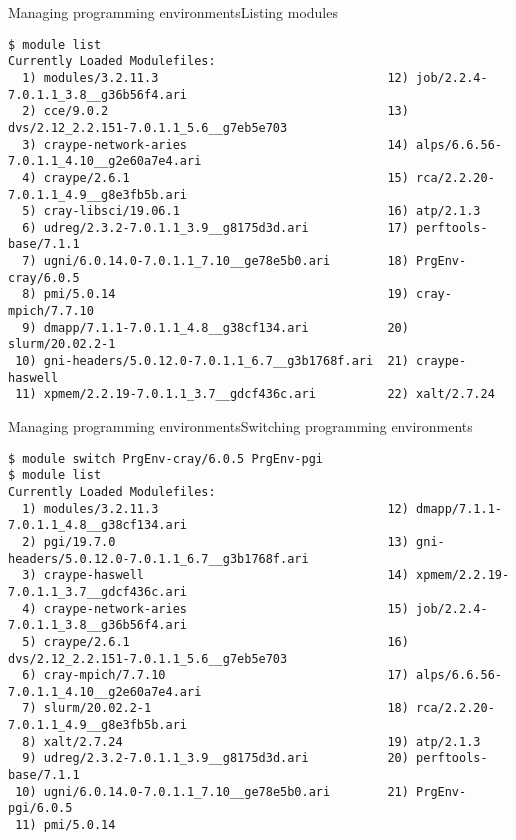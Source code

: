 \begin{frame}[fragile]{Managing programming environments}{Listing modules}
  \begin{lstlisting}[style=console]
$ module list
Currently Loaded Modulefiles:
  1) modules/3.2.11.3                                12) job/2.2.4-7.0.1.1_3.8__g36b56f4.ari
  2) cce/9.0.2                                       13) dvs/2.12_2.2.151-7.0.1.1_5.6__g7eb5e703
  3) craype-network-aries                            14) alps/6.6.56-7.0.1.1_4.10__g2e60a7e4.ari
  4) craype/2.6.1                                    15) rca/2.2.20-7.0.1.1_4.9__g8e3fb5b.ari
  5) cray-libsci/19.06.1                             16) atp/2.1.3
  6) udreg/2.3.2-7.0.1.1_3.9__g8175d3d.ari           17) perftools-base/7.1.1
  7) ugni/6.0.14.0-7.0.1.1_7.10__ge78e5b0.ari        18) PrgEnv-cray/6.0.5
  8) pmi/5.0.14                                      19) cray-mpich/7.7.10
  9) dmapp/7.1.1-7.0.1.1_4.8__g38cf134.ari           20) slurm/20.02.2-1
 10) gni-headers/5.0.12.0-7.0.1.1_6.7__g3b1768f.ari  21) craype-haswell
 11) xpmem/2.2.19-7.0.1.1_3.7__gdcf436c.ari          22) xalt/2.7.24
  \end{lstlisting}
\end{frame}

\begin{frame}[fragile]{Managing programming environments}{Switching programming environments}
  \begin{lstlisting}[style=console]
$ module switch PrgEnv-cray/6.0.5 PrgEnv-pgi
$ module list
Currently Loaded Modulefiles:
  1) modules/3.2.11.3                                12) dmapp/7.1.1-7.0.1.1_4.8__g38cf134.ari
  2) pgi/19.7.0                                      13) gni-headers/5.0.12.0-7.0.1.1_6.7__g3b1768f.ari
  3) craype-haswell                                  14) xpmem/2.2.19-7.0.1.1_3.7__gdcf436c.ari
  4) craype-network-aries                            15) job/2.2.4-7.0.1.1_3.8__g36b56f4.ari
  5) craype/2.6.1                                    16) dvs/2.12_2.2.151-7.0.1.1_5.6__g7eb5e703
  6) cray-mpich/7.7.10                               17) alps/6.6.56-7.0.1.1_4.10__g2e60a7e4.ari
  7) slurm/20.02.2-1                                 18) rca/2.2.20-7.0.1.1_4.9__g8e3fb5b.ari
  8) xalt/2.7.24                                     19) atp/2.1.3
  9) udreg/2.3.2-7.0.1.1_3.9__g8175d3d.ari           20) perftools-base/7.1.1
 10) ugni/6.0.14.0-7.0.1.1_7.10__ge78e5b0.ari        21) PrgEnv-pgi/6.0.5
 11) pmi/5.0.14
  \end{lstlisting}
\end{frame}

